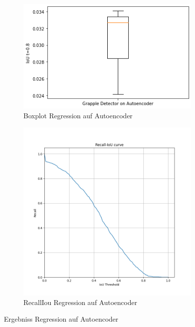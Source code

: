     \begin{figure}[h]
    	\centering
    	\begin{subfigure}[c]{0.49\textwidth}			
    		\includegraphics[width=1\textwidth,center]{bilder/Hauptteil/Autoencoder_Grappel_Detection/IoU_AE_Grapple.png}
    		\caption[Boxplot]{Boxplot Regression auf Autoencoder}
    		\label{img:BoxPlot_RegressionAufAutoencoder}	
    	\end{subfigure}
    	\begin{subfigure}[c]{0.49\textwidth}			
    		\includegraphics[width=1\textwidth, center]{bilder/Hauptteil/Autoencoder_Grappel_Detection/IoU.png}
    		\caption[Recall-IoU]{RecallIou Regression auf Autoencoder}
    		\label{img:RecalllIoUt_RegressionAufAutoencoder}	
    	\end{subfigure}
    	\caption{Ergebniss Regression auf Autoencoder}
        \label{img:ErgebnissRegressionAufAE}
    \end{figure}
 
